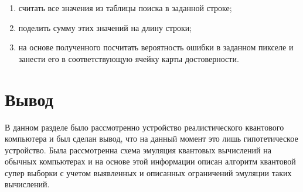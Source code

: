 \begin{enumerate}
	\item считать все значения из таблицы поиска в заданной строке;
	\item поделить сумму этих значений на длину строки;
	\item на основе полученного посчитать вероятность ошибки в заданном пикселе и занести его в соответствующую ячейку карты достоверности.
\end{enumerate}

\section*{Вывод}

В данном разделе было рассмотренно устройство реалистического квантового компьютера и был сделан вывод, что на данный момент это лишь гипотетическое устройство. Была рассмотренна схема эмуляция квантовых вычислений на обычных компьютерах и на основе этой информации описан алгоритм квантовой супер выборки с учетом выявленных и описанных ограничений эмуляции таких вычислений.
